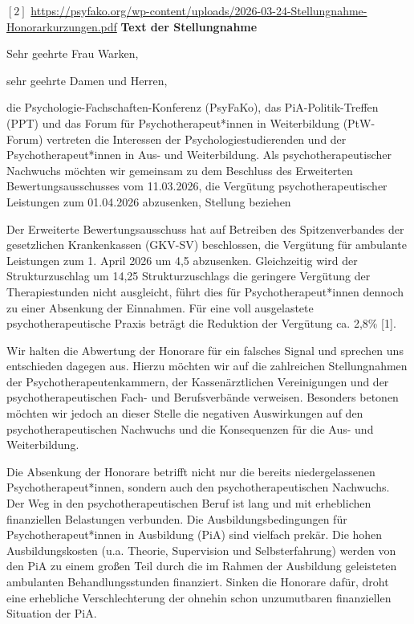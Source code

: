 \documentclass[DIV=calc]{scrartcl}
\begin{document}
$[2]$ \url{https://psyfako.org/wp-content/uploads/2026-03-24-Stellungnahme-Honorarkurzungen.pdf}
\newpage
\textbf{Text der Stellungnahme}

Sehr geehrte Frau Warken,

sehr geehrte Damen und Herren,

die Psychologie-Fachschaften-Konferenz (PsyFaKo), das PiA-Politik-Treffen (PPT) und das Forum für 
Psychotherapeut*innen in Weiterbildung (PtW-Forum) vertreten die Interessen der 
Psychologiestudierenden und der Psychotherapeut*innen in Aus- und Weiterbildung. Als 
psychotherapeutischer Nachwuchs möchten wir gemeinsam zu dem Beschluss des Erweiterten 
Bewertungsausschusses vom 11.03.2026, die Vergütung psychotherapeutischer Leistungen zum 01.04.2026 abzusenken, Stellung beziehen

Der Erweiterte Bewertungsausschuss hat auf Betreiben des Spitzenverbandes der gesetzlichen 
Krankenkassen (GKV-SV) beschlossen, die Vergütung für ambulante Leistungen zum 1. April 2026 um 4,5 %
abzusenken. Gleichzeitig wird der Strukturzuschlag um 14,25 %
Strukturzuschlags die geringere Vergütung der Therapiestunden nicht ausgleicht, führt dies für 
Psychotherapeut*innen dennoch zu einer Absenkung der Einnahmen. Für eine voll ausgelastete 
psychotherapeutische Praxis beträgt die Reduktion der Vergütung ca. 2,8\% [1].

Wir halten die Abwertung der Honorare für ein falsches Signal und sprechen uns entschieden dagegen 
aus. Hierzu möchten wir auf die zahlreichen Stellungnahmen der Psychotherapeutenkammern, der 
Kassenärztlichen Vereinigungen und der psychotherapeutischen Fach- und Berufsverbände verweisen. Besonders betonen möchten wir jedoch an dieser Stelle die negativen Auswirkungen auf den psychotherapeutischen Nachwuchs und die Konsequenzen für die Aus- und Weiterbildung. 

Die Absenkung der Honorare betrifft nicht nur die bereits niedergelassenen Psychotherapeut*innen, 
sondern auch den psychotherapeutischen Nachwuchs. Der Weg in den psychotherapeutischen Beruf ist 
lang und mit erheblichen finanziellen Belastungen verbunden. Die Ausbildungsbedingungen für 
Psychotherapeut*innen in Ausbildung (PiA) sind vielfach prekär. Die hohen Ausbildungskosten (u.a. 
Theorie, Supervision und Selbsterfahrung) werden von den PiA zu einem großen Teil durch die im Rahmen 
der Ausbildung geleisteten ambulanten Behandlungsstunden finanziert. Sinken die Honorare dafür, droht 
eine erhebliche Verschlechterung der ohnehin schon unzumutbaren finanziellen Situation der PiA.
\end{document}
